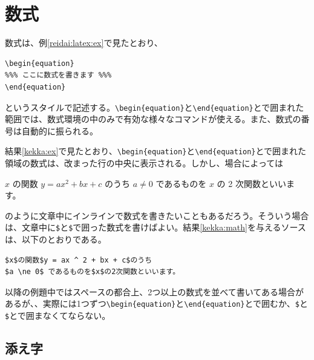 \section{数式}
\label{sec:latex:math}

数式は、例\ref{reidai:latex:ex}で見たとおり、
\begin{reidai}
\begin{verbatim}
\begin{equation}
%%% ここに数式を書きます %%%
\end{equation}
\end{verbatim}
\end{reidai} \noindent
というスタイルで記述する。\verb|\begin{equation}|と\verb|\end{equation}|とで囲まれた範囲では、数式環境の中のみで有効な様々なコマンドが使える。また、数式の番号は自動的に振られる。

結果\ref{kekka:ex}で見たとおり、\verb|\begin{equation}|と\verb|\end{equation}|とで囲まれた領域の数式は、改まった行の中央に表示される。しかし、場合によっては
\addtocounter{reidai}{1}
\begin{kekka}
  \label{kekka:math}
  $x$ の関数 $y = ax ^ 2 + bx + c$ のうち
  $a \ne 0$ であるものを $x$ の 2 次関数といいます。
\end{kekka} \noindent
\addtocounter{reidai}{-1}
のように文章中にインラインで数式を書きたいこともあるだろう。そういう場合は、文章中に\texttt{\$}と\texttt{\$}で囲った数式を書けばよい。結果\ref{kekka:math}を与えるソースは、以下のとおりである。
\begin{reidai}
\begin{verbatim}
$x$の関数$y = ax ^ 2 + bx + c$のうち
$a \ne 0$ であるものを$x$の2次関数といいます。
\end{verbatim}
\end{reidai} \noindent
以降の例題中ではスペースの都合上、2つ以上の数式を並べて書いてある場合があるが、、実際には1つずつ\verb|\begin{equation}|と\verb|\end{equation}|とで囲むか、\texttt{\$}と\texttt{\$}とで囲まなくてならない。

\subsection{添え字}
\label{sec:latex:index}

